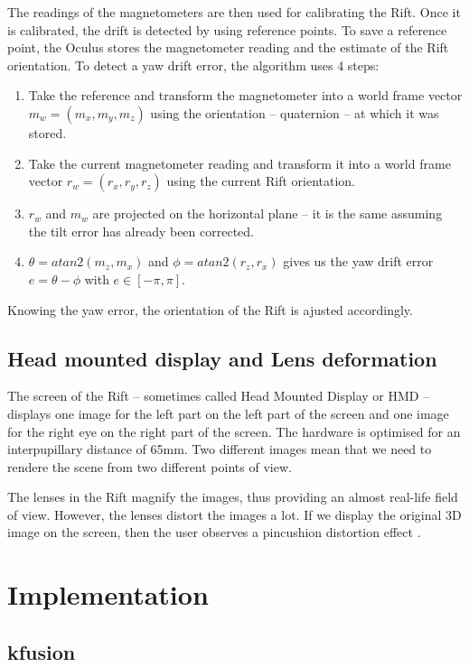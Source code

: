 \documentclass[12pt]{article}
\begin{document}
The readings of the magnetometers are then used for calibrating the Rift. Once it is calibrated, the drift is detected by using reference points. To save a reference point, the Oculus stores the magnetometer reading and the estimate of the Rift orientation. To detect a yaw drift error, the algorithm uses 4 steps:
\begin{enumerate}
\item Take the reference and transform the magnetometer into a world frame vector $m_w=(m_x,m_y,m_z)$ using the orientation -- quaternion -- at which it was stored.
\item Take the current magnetometer reading and transform it into a world frame vector $r_w=(r_x,r_y,r_z)$ using the current Rift orientation.
\item $r_w$ and $m_w$ are projected on the horizontal plane -- it is the same assuming the tilt error has already been corrected.
\item $\theta = atan2(m_z,m_x)$ and $\phi = atan2(r_z,r_x)$ gives us the yaw drift error $e = \theta - \phi$ with $e \in [-\pi,\pi]$.
\end{enumerate}

Knowing the yaw error, the orientation of the Rift is ajusted accordingly.

\subsection{Head mounted display and Lens deformation}
The screen of the Rift -- sometimes called Head Mounted Display or HMD -- displays one image for the left part on the left part of the screen and one image for the right eye on the right part of the screen. The hardware is optimised for an interpupillary distance of 65mm. Two different images mean that we need to rendere the scene from two different points of view.

The lenses in the Rift magnify the images, thus providing an almost real-life field of view. However, the lenses distort the images a lot. If we display the original 3D image on the screen, then the user observes a pincushion distortion effect \cite{OVRDoc}.

\newpage
\section{Implementation}
\subsection{kfusion}
\end{document}
